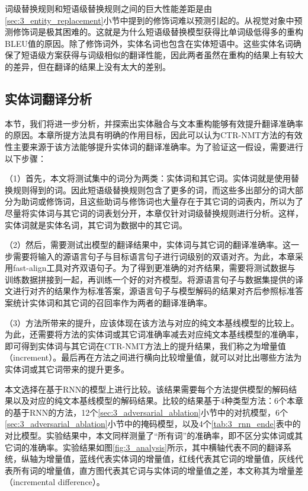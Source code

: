 词级替换规则和短语级替换规则之间的巨大性能差距是由\ref{sec:3_entity_replacement}小节中提到的修饰词难以预测引起的。从视觉对象中预测修饰词是极其困难的。这就是为什么短语级替换模型获得比单词级低得多的重构BLEU值的原因。除了修饰词外，实体名词也包含在实体短语中。这些实体名词确保了短语级方案获得与词级相似的翻译性能，因此两者虽然在重构的结果上有较大的差异，但在翻译的结果上没有太大的差别。

\subsection{实体词翻译分析}
\label{sec:3_entity_analysis}
本节，我们将进一步分析，并探索出实体融合与文本重构能够有效提升翻译准确率的原因。本章所提方法具有明确的作用目标，因此可以认为CTR-NMT方法的有效性主要来源于该方法能够提升实体词的翻译准确率。为了验证这一假设，需要进行以下步骤：

（1）首先，本文将测试集中的词分为两类：实体词和其它词。实体词就是使用替换规则得到的词。因此短语级替换规则包含了更多的词，而这些多出部分的词大部分为助词或修饰词，且这些助词与修饰词也大量存在于其它词的词表内，所以为了尽量将实体词与其它词的词表划分开，本章仅针对词级替换规则进行分析。这样，实体词就是实体名词，其它词为数据中的其它词。

（2）然后，需要测试出模型的翻译结果中，实体词与其它词的翻译准确率。这一步需要将输入的源语言句子与目标语言句子进行词级别的双语对齐。为此，本章采用fast-align工具对齐双语句子。为了得到更准确的对齐结果，需要将测试数据与训练数据拼接到一起，再训练一个好的对齐模型。将源语言句子与数据集提供的译文进行对齐的结果作为标准答案，源语言句子与模型解码的结果对齐后参照标准答案统计实体词和其它词的召回率作为两者的翻译准确率。

（3）方法所带来的提升，应该体现在该方法与对应的纯文本基线模型的比较上。为此，还需要将方法的实体词或其它词准确率减去对应纯文本基线模型的准确率，即可得到实体词与其它词在CTR-NMT方法上的提升结果，我们称之为增量值（increment）。最后再在方法之间进行横向比较增量值，就可以对比出哪些方法为实体词或其它词带来的提升更多。


本文选择在基于RNN的模型上进行比较。该结果需要每个方法提供模型的解码结果以及对应的纯文本基线模型的解码结果。比较的结果基于4种类型方法：6个本章的基于RNN的方法，12个\ref{sec:3_adversarial_ablation}小节中的对抗模型，6个\ref{sec:3_adversarial_ablation}小节中的掩码模型，以及4个\ref{tab:3_rnn_ende}表中的对比模型。实验结果中，本文同样测量了“所有词”的准确率，即不区分实体词或其它词的准确率。实验结果如图\ref{fig:3_analysis}所示，其中横轴代表不同的翻译系统，纵轴为增量值，蓝线代表实体词的增量值，红线代表其它词的增量值，灰线代表所有词的增量值，直方图代表其它词与实体词的增量值之差，本文称其为增量差（incremental difference）。

